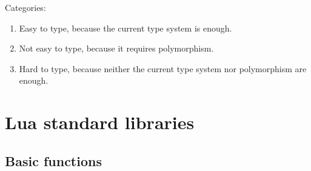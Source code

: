 
Categories:
\begin{enumerate}
\item Easy to type, because the current type system is enough.
\item Not easy to type, because it requires polymorphism.
\item Hard to type, because neither the current type system nor
      polymorphism are enough.
\end{enumerate}

\section{Lua standard libraries}

\subsection{Basic functions}

